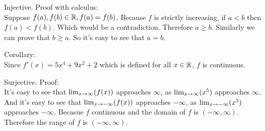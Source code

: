         Injective. Proof with calculus: \\
            Suppose $f(a), f(b) \in \mathbb{R}, f(a) = f(b)$.
            Because $f$ is strictly increasing,
            if $a < b$ then $f(a) < f(b)$.
            Which would be a contradiction.
            Therefore $a \geq b$.
            Similarly we can prove that $b \geq a$.
            So it's easy to see that $a = b$.


        Corollary: \\ %
        Since $f'(x) = 5x^4 + 9x^2 + 2$ which is defined for all $x \in \mathbb{R}$,
        $f$ is continuous.

        Surjective. Proof: \\ 
        It's easy to see that $\lim_{x \to \infty}(f(x))$ approaches $\infty$, 
        as $\lim_{x \to \infty}(x^5)$ approaches $\infty$.
        And it's easy to see that $\lim_{x \to -\infty}(f(x))$ approaches $-\infty$, 
        as $\lim_{x \to -\infty}(x^5)$ approaches $-\infty$.
        Becasue $f$ continuous and the domain of $f$ is $(-\infty, \infty)$.
        Therefore the range of $f$ is $(-\infty, \infty)$.

